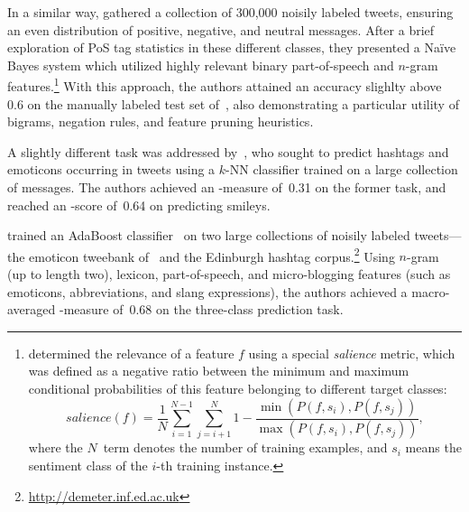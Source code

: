 In a similar way, \citet{Pak:10} gathered a collection of 300,000
noisily labeled tweets, ensuring an even distribution of positive,
negative, and neutral messages.  After a brief exploration of PoS tag
statistics in these different classes, they presented a Na{\"i}ve
Bayes system which utilized highly relevant binary part-of-speech and
$n$-gram features.\footnote{\citet{Pak:10} determined the relevance of
  a feature $f$ using a special \emph{salience} metric, which was
  defined as a negative ratio between the minimum and maximum
  conditional probabilities of this feature belonging to different
  target classes:
  \begin{equation*}
    salience(f) = \frac{1}{N}\sum_{i=1}^{N-1}\sum_{j=i+1}^N 1 - \frac{\min(P(f, s_i), P(f, s_j))}{\max(P(f, s_i), P(f, s_j))},
  \end{equation*}
  where the $N$~term denotes the number of training examples, and
  $s_i$ means the sentiment class of the $i$-th training instance.}
With this approach, the authors attained an accuracy slighlty above
0.6 on the manually labeled test set of~\citet{Go:09}, also
demonstrating a particular utility of bigrams, negation rules, and
feature pruning heuristics.

A slightly different task was addressed by~\citet{Davidov:10}, who
sought to predict hashtags and emoticons occurring in tweets using a
$k$-NN classifier trained on a large collection of messages.  The
authors achieved an \F-measure of~0.31 on the former task, and reached
an \F-score of~0.64 on predicting smileys.

\citet{Kouloumpis:11} trained an AdaBoost
classifier~\cite{Schapire:00} on two large collections of noisily
labeled tweets---the emoticon tweebank of~\citet{Go:09} and the
Edinburgh hashtag corpus.\footnote{\url{http://demeter.inf.ed.ac.uk}}
Using $n$-gram (up to length two), lexicon, part-of-speech, and
micro-blogging features (such as emoticons, abbreviations, and slang
expressions), the authors achieved a macro-averaged \F-measure of~0.68
on the three-class prediction task.

